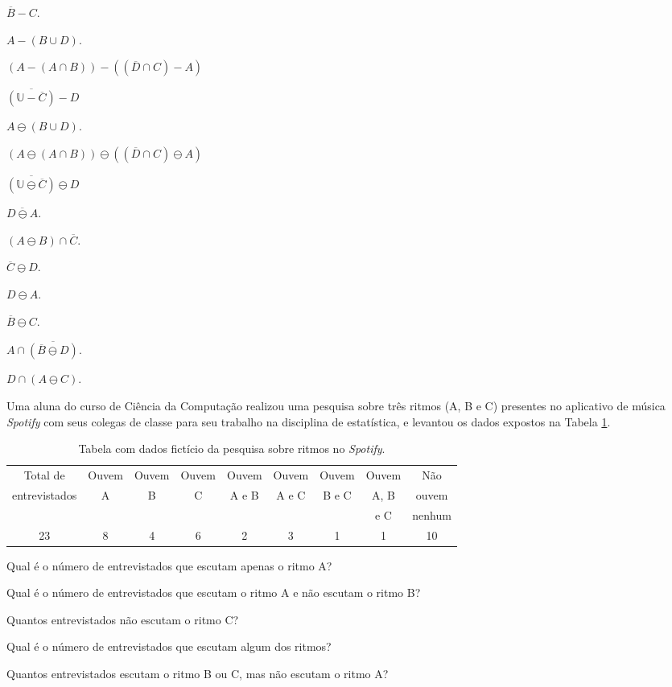\begin{exerList}
	\item $\overline{B} - C$.
	\item $A - (B \cup D)$.
	\item $(A - (A \cap B)) - ((\overline{D} \cap C) - A)$
	\item $\overline{(\mathbb{U} - \overline{C})} - D$
	\item $A \ominus (B \cup D)$.
	\item $(A \ominus (A \cap B)) \ominus ((\overline{D} \cap C) \ominus A)$
	\item $\overline{(\mathbb{U} \ominus \overline{C})} \ominus D$
	\item $\overline{D \ominus A}$.
	\item $(A \ominus B) \cap \overline{C}$.
	\item $\overline{C} \ominus D$.
	\item $D \ominus A$.
	\item $\overline{B} \ominus C$.
	\item $A \cap \overline{(\overline{B} \ominus D)}$.
	\item $D \cap (A \ominus C)$.
\end{exerList}

\begin{questao}\label{test:Conjuntos11}
	Uma aluna do curso de Ciência da Computação realizou uma pesquisa sobre três ritmos (A, B e C) presentes no aplicativo de música \textit{Spotify} com seus colegas de classe para seu trabalho na disciplina de estatística,  e levantou os dados expostos na Tabela \ref{tab:TabelaDeDados}.
\end{questao}

\begin{table}[h]
	\scriptsize
	\centering
	\begin{tabular}{ccccccccc}
		\hline
		Total de&Ouvem&Ouvem&Ouvem&Ouvem&Ouvem&Ouvem&Ouvem&Não\\
		entrevistados&A&B&C&A e B&A e C&B e C&A, B&ouvem\\
    & & & & & & &e C&nenhum\\
		\hline
		23 & 8 & 4 & 6 & 2 & 3 & 1 & 1 & 10\\
		\hline
	\end{tabular}
	\caption{Tabela com dados fictício da pesquisa sobre ritmos no \textit{Spotify}.}
	\label{tab:TabelaDeDados}
\end{table}

\begin{exerList}
	\item Qual é o número de entrevistados que escutam apenas o ritmo A?
	\item Qual é o número de entrevistados que escutam o ritmo A e não escutam o ritmo B?
	\item Quantos entrevistados não escutam o ritmo C?
	\item Qual é o número de entrevistados que escutam algum dos ritmos?
	\item Quantos entrevistados escutam o ritmo B ou C, mas não escutam o ritmo A?
\end{exerList}

